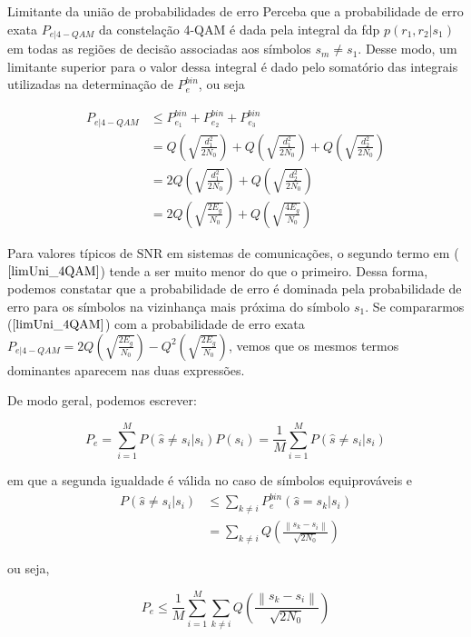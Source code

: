 \documentclass[
  ignorenonframetext,
]{beamer}
\begin{document}
\begin{frame}{Limitante da união de probabilidades de erro}
Perceba que a probabilidade de erro exata \(P_{e|4-QAM}\) da constelação
4-QAM é dada pela integral da fdp \(p(r_1, r_2|s_1)\) em todas as
regiões de decisão associadas aos símbolos \(s_m\neq s_1\). Desse modo,
um limitante superior para o valor dessa integral é dado pelo somatório
das integrais utilizadas na determinação de \(P_e^{bin}\), ou seja

\[
\begin{align}
P_{e|4-QAM} &\leq P_{e_1}^{b i n} + P_{e_2}^{b i n} + P_{e_3}^{b i n}\nonumber\\
 &= Q\left(\sqrt{\frac{d_1^2}{2N_0}}\right) + Q\left(\sqrt{\frac{d_1^2}{2N_0}}\right) + Q\left(\sqrt{\frac{d_2^2}{2N_0}}\right)\nonumber\\
 &= 2Q\left(\sqrt{\frac{d_1^2}{2N_0}}\right) + Q\left(\sqrt{\frac{d_2^2}{2N_0}}\right)\nonumber\\
 &= 2Q\left(\sqrt{\frac{2E_g}{N_0}}\right) + Q\left(\sqrt{\frac{4E_g}{N_0}}\right)\label{limUni_4QAM}
\end{align}
\]

Para valores típicos de \(\mathrm{SNR}\) em sistemas de comunicações, o
segundo termo em (\(\ref{limUni_4QAM}\)) tende a ser muito menor do que
o primeiro. Dessa forma, podemos constatar que a probabilidade de erro é
dominada pela probabilidade de erro para os símbolos na vizinhança mais
próxima do símbolo \(s_1\). Se compararmos (\(\ref{limUni_4QAM}\)) com a
probabilidade de erro exata
\(P_{e|4-QAM}=2 Q\left(\sqrt{\frac{2 E_g}{N_0}}\right)-Q^2\left(\sqrt{\frac{2 E_g}{N_0}}\right)\),
vemos que os mesmos termos dominantes aparecem nas duas expressões.

De modo geral, podemos escrever:

\begin{equation}
P_{e}=\sum_{i=1}^M P(\hat{s} \neq s_i| s_i) P(s_i) = \frac{1}{M} \sum_{i=1}^M P(\hat{s} \neq s_i| s_i)
\end{equation}

em que a segunda igualdade é válida no caso de símbolos equiprováveis e
\[
\begin{align}
P(\hat{s} \neq s_i| s_i) & \leq \sum_{k \neq i} P_e^{bin}(\hat{s} = s_k| s_i) \\
& =\sum_{k \neq i} Q\left(\frac{\left\|s_k-s_i\right\|}{\sqrt{2 N_0}}\right)
\end{align}
\]

ou seja,

\begin{equation}
P_{e}\leq \frac{1}{M} \sum_{i=1}^M \sum_{k \neq i} Q\left(\frac{\left\|s_k-s_i\right\|}{\sqrt{2 N_0}}\right)
\end{equation}


\end{frame}
\end{document}
